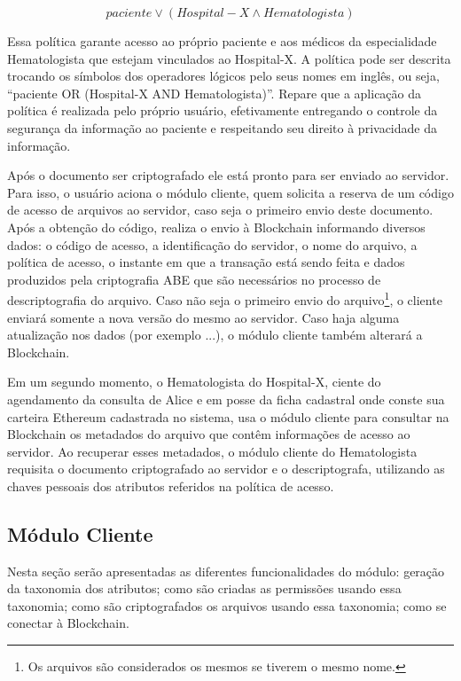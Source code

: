 \documentclass[a4paper,11pt]{article}
\begin{document}
\[paciente \vee (Hospital-X \wedge Hematologista)\] %

Essa política garante acesso ao próprio paciente e aos médicos da especialidade Hematologista que estejam vinculados ao Hospital-X. A política pode ser descrita trocando os símbolos dos operadores lógicos pelo seus nomes em inglês, ou seja, ``paciente OR (Hospital-X AND Hematologista)''. %
Repare que a aplicação da política é realizada pelo próprio usuário, efetivamente entregando o controle da segurança da informação ao paciente e respeitando seu direito à privacidade da informação.

Após o documento ser criptografado ele está pronto para ser enviado ao servidor.
Para isso, o usuário aciona o módulo cliente, quem solicita a reserva de um código de acesso de arquivos ao servidor, caso seja o primeiro envio deste documento.
Após a obtenção do código, realiza o envio à Blockchain informando diversos dados: o código de acesso, a identificação do servidor, o nome do arquivo, a política de acesso, o instante em que a transação está sendo feita e dados produzidos pela criptografia ABE que são necessários no processo de descriptografia do arquivo.
Caso não seja o primeiro envio do arquivo\footnote{Os arquivos são considerados os mesmos se tiverem o mesmo nome.}, o cliente enviará somente a nova versão do mesmo ao servidor.
Caso haja alguma atualização nos dados ({\color{magenta}por exemplo ...}), o módulo cliente também alterará a Blockchain.

Em um segundo momento, o Hematologista do Hospital-X, ciente do agendamento da consulta de Alice e em posse da  ficha cadastral onde conste sua carteira Ethereum cadastrada no sistema, usa o módulo cliente para consultar na Blockchain os metadados do arquivo que contêm informações de acesso ao servidor. %
Ao recuperar esses metadados, o módulo cliente do Hematologista requisita o documento criptografado ao servidor e o descriptografa, utilizando as chaves pessoais dos atributos referidos na política de acesso.

\subsection{Módulo Cliente}

Nesta seção serão apresentadas as diferentes funcionalidades do módulo: geração da taxonomia dos atributos; como são criadas as permissões usando essa taxonomia; como são criptografados os arquivos usando essa taxonomia; como se conectar à Blockchain.
\end{document}
